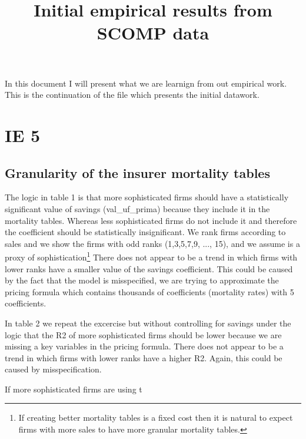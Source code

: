 \documentclass[12pt]{article}
\begin{document}
\title{Initial empirical results from SCOMP data}

\maketitle

In this document I will present what we are learnign from out empirical work. This is the continuation of the file which presents the initial datawork. 

\section{IE 5}

\subsection{Granularity of the insurer mortality tables}

The logic in table 1 is that more sophisticated firms should have a statistically significant value of savings (val\_uf\_prima) because they include it in the mortality tables. Whereas less sophisticated firms do not include it and therefore the coefficient should be statistically insignificant. We rank firms according to sales and we show the firms with odd ranks (1,3,5,7,9, ..., 15), and we assume is a proxy of sophistication\footnote{If creating better mortality tables is a fixed cost then it is natural to expect firms with more sales to have more granular mortality tables.} There does not appear to be a trend in which firms with lower ranks have a smaller value of the savings coefficient. This could be caused by the fact that the model is misspecified, we are trying to approximate the pricing formula which contains thousands of coefficients (mortality rates) with 5 coefficients. 

In table 2 we repeat the excercise but without controlling for savings under the logic that the R2 of more sophisticated firms should be lower because we are missing a key variables in the pricing formula. There does not appear to be a trend in which firms with lower ranks have a higher R2. Again, this could be caused by misspecification.



 

If more sophisticated firms are using t
 

 
 

\newpage 
\end{document}

